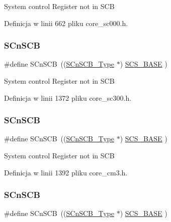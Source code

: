 System control Register not in S\+CB 

Definicja w linii 662 pliku core\+\_\+sc000.\+h.

\mbox{\label{group___c_m_s_i_s__core__base_ga9fe0cd2eef83a8adad94490d9ecca63f}} 
\subsubsection{\texorpdfstring{S\+Cn\+S\+CB}{SCnSCB}\hspace{0.1cm}{\footnotesize\ttfamily [3/8]}}
{\footnotesize\ttfamily \#define S\+Cn\+S\+CB~((\hyperlink{struct_s_cn_s_c_b___type}{S\+Cn\+S\+C\+B\+\_\+\+Type}    $\ast$)     \hyperlink{group___c_m_s_i_s__core__base_ga3c14ed93192c8d9143322bbf77ebf770}{S\+C\+S\+\_\+\+B\+A\+SE}      )}

System control Register not in S\+CB 

Definicja w linii 1372 pliku core\+\_\+sc300.\+h.

\mbox{\label{group___c_m_s_i_s__core__base_ga9fe0cd2eef83a8adad94490d9ecca63f}} 
\subsubsection{\texorpdfstring{S\+Cn\+S\+CB}{SCnSCB}\hspace{0.1cm}{\footnotesize\ttfamily [4/8]}}
{\footnotesize\ttfamily \#define S\+Cn\+S\+CB~((\hyperlink{struct_s_cn_s_c_b___type}{S\+Cn\+S\+C\+B\+\_\+\+Type}    $\ast$)     \hyperlink{group___c_m_s_i_s__core__base_ga3c14ed93192c8d9143322bbf77ebf770}{S\+C\+S\+\_\+\+B\+A\+SE}      )}

System control Register not in S\+CB 

Definicja w linii 1392 pliku core\+\_\+cm3.\+h.

\mbox{\label{group___c_m_s_i_s__core__base_ga9fe0cd2eef83a8adad94490d9ecca63f}} 
\subsubsection{\texorpdfstring{S\+Cn\+S\+CB}{SCnSCB}\hspace{0.1cm}{\footnotesize\ttfamily [5/8]}}
{\footnotesize\ttfamily \#define S\+Cn\+S\+CB~((\hyperlink{struct_s_cn_s_c_b___type}{S\+Cn\+S\+C\+B\+\_\+\+Type}    $\ast$)     \hyperlink{group___c_m_s_i_s__core__base_ga3c14ed93192c8d9143322bbf77ebf770}{S\+C\+S\+\_\+\+B\+A\+SE}      )}

